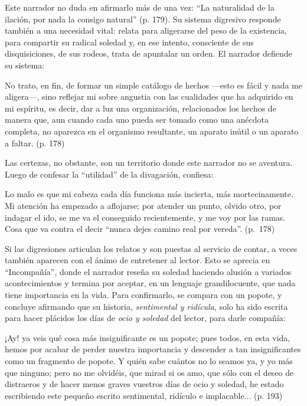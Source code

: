 \documentclass[14pt,twoside,final]{extbook} %
\begin{document}
Este narrador no duda en afirmarlo más de una vez: ``La naturalidad de la ilación, por nada la consigo natural'' (p. 179). Su sistema digresivo responde también a una necesidad vital: relata para
aligerarse del peso de la existencia, para compartir su radical soledad y, en ese intento, consciente de sus disquisiciones, de sus rodeos, trata de apuntalar un orden. El narrador defiende su sistema:
\begin{quoting}
No trato, en fin, de formar un simple catálogo de hechos ---esto es fácil y nada me aligera---, sino reflejar mi sobre angustia con las cualidades que ha adquirido en mi espíritu, es decir, dar a luz una organización, relacionados los hechos de manera que, aun cuando cada uno pueda ser tomado como una anécdota completa, no aparezca en el organismo resultante, un aparato inútil o un aparato a faltar. (p. 178)
\end{quoting}
Las certezas, no obstante, son un territorio donde este narrador no se aventura. Luego de confesar la ``utilidad'' de la divagación, confiesa:
\begin{quoting}
Lo malo es que mi cabeza cada día funciona más incierta, más mortecinamente. Mi atención ha empezado a aflojarse; por atender un punto, olvido otro, por indagar el ido, se me va el conseguido recientemente, y me voy por las ramas. Cosa que va contra el decir ``nunca dejes camino real por vereda''. (p.~178)
\end{quoting}
Si las digresiones articulan los relatos y son puestas al servicio de contar, a veces también aparecen con el ánimo de entretener al lector. Esto se aprecia en ``Incompañía'', donde el narrador reseña su soledad haciendo alusión a variados acontecimientos y termina por aceptar, en un lenguaje grandilocuente, que nada tiene importancia en la vida. Para confirmarlo, se compara con un popote, y concluye afirmando que su historia, \emph{sentimental y ridícula}, solo ha sido escrita para hacer plácidos los días de \emph{ocio y soledad} del lector, para darle compañía:
\begin{quoting}
¡Ay! ya veis qué cosa más insignificante es un popote; pues todos, en esta vida, hemos por acabar de perder nuestra importancia y descender a tan insignificantes como un fragmento de popote. Y quién sabe cuántos no lo seamos ya, y yo más que ninguno; pero no me olvidéis, que mirad si os amo, que sólo con el deseo de distraeros y de hacer menos graves vuestros días de ocio y soledad, he estado
escribiendo este pequeño escrito sentimental, ridículo e implacable... (p. 193)
\end{quoting}
\end{document}
